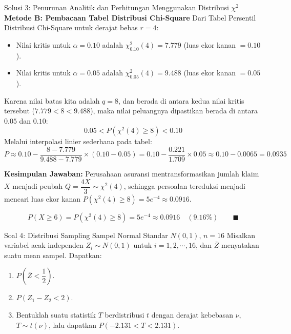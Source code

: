 \documentclass[10pt,twoside]{article}
\begin{document}
\begin{solbox}{Solusi 3: Penurunan Analitik dan Perhitungan Menggunakan Distribusi $\chi^2$}
\textbf{Metode B: Pembacaan Tabel Distribusi Chi-Square}
Dari Tabel Persentil Distribusi Chi-Square untuk derajat bebas $r = 4$:
\begin{itemize}
  \item Nilai kritis untuk $\alpha = 0.10$ adalah $\chi_{0.10}^2(4) = 7.779$ (luas ekor kanan $= 0.10$).
  \item Nilai kritis untuk $\alpha = 0.05$ adalah $\chi_{0.05}^2(4) = 9.488$ (luas ekor kanan $= 0.05$).
\end{itemize}
Karena nilai batas kita adalah $q = 8$, dan berada di antara kedua nilai kritis tersebut ($7.779 < 8 < 9.488$), maka nilai peluangnya dipastikan berada di antara $0.05$ dan $0.10$:
\[
0.05 < P(\chi^2(4) \ge 8) < 0.10
\]
Melalui interpolasi linier sederhana pada tabel:
\[
P \approx 0.10 - \frac{8 - 7.779}{9.488 - 7.779} \times (0.10 - 0.05) = 0.10 - \frac{0.221}{1.709} \times 0.05 \approx 0.10 - 0.0065 = 0.0935
\]

\textbf{Kesimpulan Jawaban:}
Perusahaan asuransi mentransformasikan jumlah klaim $X$ menjadi peubah $Q = \dfrac{4X}{3} \sim \chi^2(4)$, sehingga persoalan tereduksi menjadi mencari luas ekor kanan $P(\chi^2(4) \ge 8) = 5e^{-4} \approx 0.0916$.

\[
\boxed{P(X \ge 6) = P\left(\chi^2(4) \ge 8\right) = 5e^{-4} \approx 0.0916 \quad (9.16\%)} \qquad \blacksquare
\]
\end{solbox}

\begin{soalbox}{Soal 4: Distribusi Sampling Sampel Normal Standar $N(0, 1)$, $n=16$}
Misalkan variabel acak independen $Z_i \sim N(0,1)$ untuk $i = 1, 2, \cdots, 16$, dan $\bar{Z}$ menyatakan suatu mean sampel. Dapatkan:
\begin{enumerate}[label=(\alph*)]
  \item $P\left(\bar{Z} < \dfrac{1}{2}\right)$.
  \item $P(Z_1 - Z_2 < 2)$.
  \item Bentuklah suatu statistik $T$ berdistribusi $t$ dengan derajat kebebasan $\nu$, $T \sim t(\nu)$, lalu dapatkan $P(-2.131 < T < 2.131)$.
\end{enumerate}
\end{soalbox}
\end{document}
